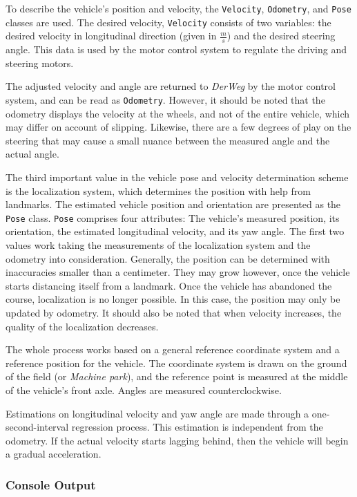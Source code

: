 \documentclass[a4paper, 11pt]{article}
\newcommand{\code}[1]{\texttt{#1}}
\newcommand{\DerWeg}{\textit{DerWeg }} %
\begin{document}
To describe the vehicle’s position and velocity, the \code{Velocity}, \code{Odometry}, and \code{Pose} classes are used.  The desired velocity, \code{Velocity} consists of two variables: the desired velocity in longitudinal direction (given in $\frac{m}{s}$) and the desired steering angle.  This data is used by the motor control system to regulate the driving and steering motors.

The adjusted velocity and angle are returned to \DerWeg by the motor control system, and can be read as \code{Odometry}. However, it should be noted that the odometry displays the velocity at the wheels, and not of the entire vehicle, which may differ on account of slipping. Likewise, there are a few degrees of play on the steering that may cause a small nuance between the measured angle and the actual angle.

The third important value in the vehicle pose and velocity determination scheme is the localization system, which determines the position with help from landmarks. The estimated vehicle position and orientation are presented as the \code{Pose} class. \code{Pose} comprises four attributes: The vehicle’s measured position, its orientation, the estimated longitudinal velocity, and its yaw angle. The first two values work taking the measurements of the localization system and the odometry into consideration. Generally, the position can be determined with inaccuracies smaller than a centimeter. They may grow however, once the vehicle starts distancing itself from a landmark. Once the vehicle has abandoned the course, localization is no longer possible. In this case, the position may only be updated by odometry. It should also be noted that when velocity increases, the quality of the localization decreases.

The whole process works based on a general reference coordinate system and a reference position for the vehicle. The coordinate system is drawn on the ground of the field (or \textit{Machine park}), and the reference point is measured at the middle of the vehicle’s front axle. Angles are measured counterclockwise. 

Estimations on longitudinal velocity and yaw angle are made through a one-second-interval regression process. This estimation is independent from the odometry. If the actual velocity starts lagging behind, then the vehicle will begin a gradual acceleration.

\subsubsection{Console Output}
\end{document}

